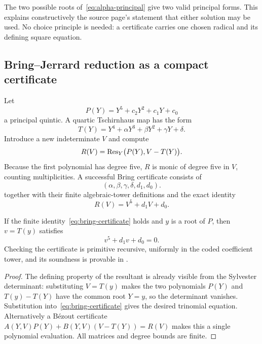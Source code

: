 The two possible roots of~\eqref{eq:alpha-principal} give two valid principal
forms.  This explains constructively the source page's statement that either
solution may be used.  No choice principle is needed: a certificate carries one
chosen radical and its defining square equation.

\subsection{Bring--Jerrard reduction as a compact certificate}

Let
\[
 P(Y)=Y^5+c_2Y^2+c_1Y+c_0
\]
a principal quintic.  A quartic Tschirnhaus map has the form
\begin{equation}\label{eq:quartic-tsch}
 T(Y)=Y^4+\alpha Y^3+\beta Y^2+\gamma Y+\delta.
\end{equation}
Introduce a new indeterminate \(V\) and compute
\begin{equation}\label{eq:tsch-resultant}
 R(V)=\operatorname{Res}_Y\bigl(P(Y),V-T(Y)\bigr).
\end{equation}
Because the first polynomial has degree five, \(R\) is monic of degree five in
\(V\), counting multiplicities.  A successful Bring certificate consists of
\[
 (\alpha,\beta,\gamma,\delta,d_1,d_0).
\]
together with their finite algebraic-tower definitions and the exact identity
\begin{equation}\label{eq:bring-certificate}
 R(V)=V^5+d_1V+d_0.
\end{equation}

\begin{theorem}
\label{thm:bring-certificate-sound}
If the finite identity~\eqref{eq:bring-certificate} holds and \(y\) is a root
of \(P\), then \(v=T(y)\) satisfies
\[
 v^5+d_1v+d_0=0.
\]
Checking the certificate is primitive recursive, uniformly in the coded
coefficient tower, and its soundness is provable in \ipra.
\end{theorem}

\begin{proof}
The defining property of the resultant is already visible from the Sylvester
determinant: substituting \(V=T(y)\) makes the two polynomials
\(P(Y)\) and \(T(y)-T(Y)\) have the common root \(Y=y\), so the determinant
vanishes.  Substitution into~\eqref{eq:bring-certificate} gives the desired
trinomial equation.  Alternatively a Bézout certificate
\(A(Y,V)P(Y)+B(Y,V)(V-T(Y))=R(V)\) makes this a single polynomial evaluation.
All matrices and degree bounds are finite.
\end{proof}

